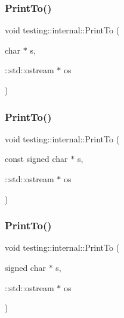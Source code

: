 \mbox{\label{namespacetesting_1_1internal_a553eec7bb50de01c9e91cac4accc606f}} 
\subsubsection{\texorpdfstring{PrintTo()}{PrintTo()}\hspace{0.1cm}{\footnotesize\ttfamily [8/16]}}
{\footnotesize\ttfamily void testing\+::internal\+::\+Print\+To (\begin{DoxyParamCaption}\item[{char $\ast$}]{s,  }\item[{\+::std\+::ostream $\ast$}]{os }\end{DoxyParamCaption})\hspace{0.3cm}{\ttfamily [inline]}}

\mbox{\label{namespacetesting_1_1internal_a792cc5665a34619ed7a6d54711433456}} 
\subsubsection{\texorpdfstring{PrintTo()}{PrintTo()}\hspace{0.1cm}{\footnotesize\ttfamily [9/16]}}
{\footnotesize\ttfamily void testing\+::internal\+::\+Print\+To (\begin{DoxyParamCaption}\item[{const signed char $\ast$}]{s,  }\item[{\+::std\+::ostream $\ast$}]{os }\end{DoxyParamCaption})\hspace{0.3cm}{\ttfamily [inline]}}

\mbox{\label{namespacetesting_1_1internal_a1320096b116f8cc4b688acbd5b783051}} 
\subsubsection{\texorpdfstring{PrintTo()}{PrintTo()}\hspace{0.1cm}{\footnotesize\ttfamily [10/16]}}
{\footnotesize\ttfamily void testing\+::internal\+::\+Print\+To (\begin{DoxyParamCaption}\item[{signed char $\ast$}]{s,  }\item[{\+::std\+::ostream $\ast$}]{os }\end{DoxyParamCaption})\hspace{0.3cm}{\ttfamily [inline]}}

